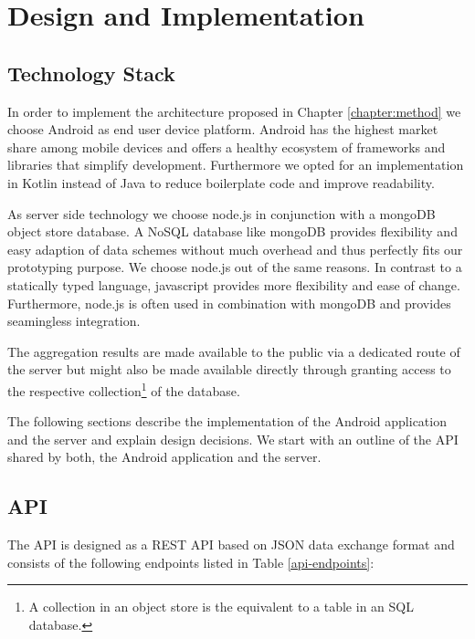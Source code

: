 \chapter{Design and Implementation}\label{chapter:design}

\section{Technology Stack}
In order to implement the architecture proposed in Chapter \ref{chapter:method} we choose Android as end user device platform. Android has the highest market share among mobile devices \cite{android-market-share} and offers a healthy ecosystem of frameworks and libraries that simplify development. Furthermore we opted for an implementation in Kotlin instead of Java to reduce boilerplate code and improve readability.

As server side technology we choose node.js in conjunction with a mongoDB object store database. A NoSQL database like mongoDB provides flexibility and easy adaption of data schemes without much overhead and thus perfectly fits our prototyping purpose. We choose node.js out of the same reasons. In contrast to a statically typed language, javascript provides more flexibility and ease of change. Furthermore, node.js is often used in combination with mongoDB and provides seamingless integration.

The aggregation results are made available to the public via a dedicated route of the server but might also be made available directly through granting access to the respective collection\footnote{A collection in an object store is the equivalent to a table in an SQL database.} of the database.

The following sections describe the implementation of the Android application and the server and explain design decisions. We start with an outline of the API shared by both, the Android application and the server.\\

\section{API}\label{api}
The API is designed as a REST API based on JSON data exchange format and consists of the following endpoints listed in Table \ref{api-endpoints}:

